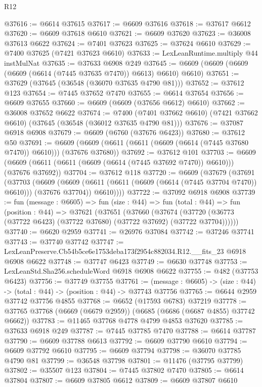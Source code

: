 \begin{lexlean}{R12}
\begin{coremodule}
@37616 := @6614 @37615
@37617 := @6609 @37616
@37618 := @37617 @6612
@37620 := @6609 @37618 @6610
@37621 := @6609 @37620
@37623 := @36008 @37613 @6622
@37624 := @7401 @37623
@37625 := @37624 @6610
@37629 := @7400 @37625 (@7421 @37623 @6610)
@37633 := LexLeanRuntime.multiply @44 instMulNat
@37635 := @37633 @6908 @249
@37645 := @6609 (@6609 (@6609 (@6609 (@6614 (@7445 @37635 @7470)) @6613) @6610) @6610)
@37651 := @37629 (@37645 (@36548 (@36070 @37635 @4790 @81)))
@37652 := @37612 @123
@37654 := @7445 @37652 @7470
@37655 := @6614 @37654
@37656 := @6609 @37655
@37660 := @6609 (@6609 (@37656 @6612) @6610)
@37662 := @36008 @37652 @6622
@37674 := @7400
    (@7401 @37662 @6610)
    (@7421 @37662 @6610)
    (@37645 (@36548 (@36012 @37635 @4790 @81)))
@37676 := @37087 @6918 @6908
@37679 := @6609 (@6760 (@37676 @6423))
@37680 := @37612 @50
@37691 := @6609 (@6609 (@6611 (@6611 (@6609 (@6614 (@7445 @37680 @7470)) @6610))) (@37676 @37680))
@37692 := @37612 @101
@37703 := @6609 (@6609 (@6611 (@6611 (@6609 (@6614 (@7445 @37692 @7470)) @6610))) (@37676 @37692))
@37704 := @37612 @118
@37720 := @6609
    (@37679
      (@37691
        (@37703
          (@6609
            (@6609 (@6611 (@6611 (@6609 (@6614 (@7445 @37704 @7470)) @6610))) (@37676 @37704))
            @6610))))
@37722 := @37092 @6918 @6908
@37739 := fun (message : @6605) =>
  fun (size : @44) =>
  fun (total : @44) =>
  fun (position : @44) =>
  @37621
    (@37651
      (@37660
        (@37674 (@37720 (@36773 (@37722 @6423) (@37722 @37680) (@37722 @37692) (@37722 @37704))))))
@37740 := @6620 @2959
@37741 := @26976 @37084
@37742 := @37246 @37741
@37743 := @37740 @37742
@37747 := LexLeanPreserve.Cb54b5ce6e1753deba173f2954c882034.R12.__fits_23 @6918 @6908 @6622
@37748 := @37747 @6423
@37749 := @6630 @37748
@37753 := LexLeanStd.Sha256.scheduleWord @6918 @6908 @6622
@37755 := @482 (@37753 @6423)
@37756 := @37749 @37755
@37761 := (message : @6605) -> (size : @44) -> (total : @44) -> (position : @44) -> @37743 @37756
@37765 := @6644 @2959 @37742 @37756 @4855
@37768 := @6652 (@17593 @6783) @37219
@37778 := @37765 @37768 (@6669 (@6679 @2959)) (@6685 (@6686 (@6687 @4855) @37742 @6662))
@37783 := @11465 @37768 @4778 @4799 @4853 @37620
@37785 := @37633 @6918 @249
@37787 := @7445 @37785 @7470
@37788 := @6614 @37787
@37790 := @6609 @37788 @6613
@37792 := @6609 @37790 @6610
@37794 := @6609 @37792 @6610
@37795 := @6609 @37794
@37798 := @36070 @37785 @4790 @81
@37799 := @36548 @37798
@37801 := @11476 (@37795 @37799)
@37802 := @35507 @123
@37804 := @7445 @37802 @7470
@37805 := @6614 @37804
@37807 := @6609 @37805 @6612
@37809 := @6609 @37807 @6610

\end{coremodule}
\end{lexlean}
